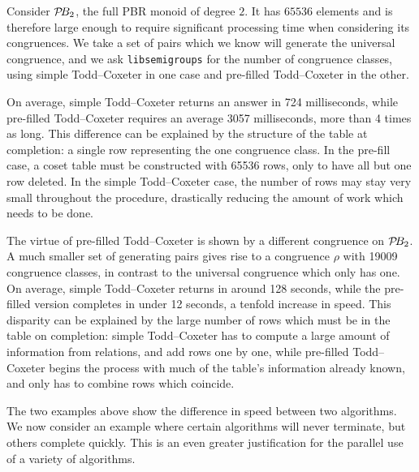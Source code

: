 \begin{example}
  \label{ex:good-tc}
  Consider $\mathcal{P}\!B_2$, the full PBR monoid of degree $2$.  It has $65536$ elements
  and is therefore large enough to require significant processing time when
  considering its congruences.   We take a set of pairs which we know will
  generate the universal congruence, and we ask \texttt{libsemigroups} for the
  number of congruence classes, using simple Todd--Coxeter in one case and
  pre-filled Todd--Coxeter in the other.

  On average, simple Todd--Coxeter returns an answer in 724 milliseconds, while
  pre-filled Todd--Coxeter requires an average 3057 milliseconds, more than 4
  times as long.  This difference can be explained by the structure
  of the table at completion: a single row representing the one congruence
  class.  In the pre-fill case, a coset table must be constructed with 65536
  rows, only to have all but one row deleted.  In the simple Todd--Coxeter case,
  the number of rows may stay very small throughout the procedure, drastically
  reducing the amount of work which needs to be done.
\end{example}

\begin{example}
  \label{ex:good-tc-prefill}
  The virtue of pre-filled Todd--Coxeter is shown by a different congruence on
  $\mathcal{P}\!B_2$.  A much smaller set of generating pairs gives rise to a congruence
  $\rho$ with 19009 congruence classes, in contrast to the universal congruence
  which only has one.  On average, simple Todd--Coxeter returns in around 128
  seconds, while the pre-filled version completes in under 12 seconds, a tenfold
  increase in speed.  This disparity can be explained by the large number of
  rows which must be in the table on completion: simple Todd--Coxeter has to
  compute a large amount of information from relations, and add rows one by one,
  while pre-filled Todd--Coxeter begins the process with much of the table's
  information already known, and only has to combine rows which coincide.
\end{example}

The two examples above show the difference in speed between two algorithms.  We
now consider an example where certain algorithms will never terminate, but
others complete quickly.  This is an even greater justification for the parallel
use of a variety of algorithms.


